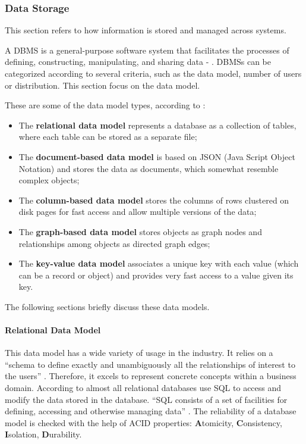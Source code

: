 \subsubsection{Data Storage}
\label{subsubsec:stateofart:arch:infra:store}

This section refers to how information is stored and managed across systems.

A \gls{DBMS} is a general-purpose software system that facilitates the processes of defining, constructing, manipulating, and sharing data - . \gls{DBMS}s can be categorized according to several criteria, such as the data model, number of users or distribution. This section focus on the data model.

These are some of the data model types, according to \cite{elmasri2000fundamentals}:

\begin{itemize}
    \item The \textbf{relational data model} represents a database as a collection of tables, where each table can be stored as a separate file;
    \item The \textbf{document-based data model} is based on JSON (Java Script Object Notation) and stores the data as documents, which somewhat resemble complex objects;
    \item The \textbf{column-based data model} stores the columns of rows clustered on disk pages for fast access and allow multiple versions of the data;
    \item The \textbf{graph-based data model} stores objects as graph nodes and relationships among objects as directed graph edges;
    \item The \textbf{key-value data model} associates a unique key with each value (which can be a record or object) and provides very fast access to a value given its key.
\end{itemize}

The following sections briefly discuss these data models.

\paragraph{Relational Data Model}
\label{par:stateofart:arch:infra:store:relational}

This data model has a wide variety of usage in the industry. It relies on a ``schema to define exactly and unambiguously all the relationships of interest to the users'' \parencite{zaniolo1981design}. Therefore, it excels to represent concrete concepts within a business domain. According to \cite{jatana2012survey} almost all relational databases use \gls{SQL} to access and modify the data stored in the database. ``\gls{SQL} consists of a set of facilities for defining, accessing and otherwise managing data'' \parencite{date1989guide}. The reliability of a database model is checked with the help of ACID properties: \textbf{A}tomicity, \textbf{C}onsistency, \textbf{I}solation, \textbf{D}urability.

